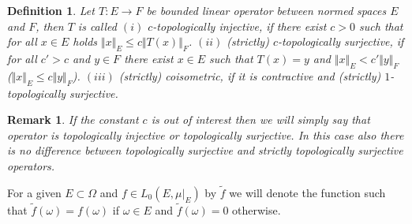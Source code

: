 \documentclass[12pt]{article}
\newtheorem{remark}[theorem]{Remark}
\newtheorem{definition}[theorem]{Definition}
\begin{document}
\begin{definition}\label{DefNorOpType} Let $ T:E\to F$ be bounded linear
    operator between normed spaces $E$ and $F$, then $ T$ is called
    \newline
    $(i)$ \textit{$c$-topologically injective}, if there exist $c > 0$ such that
    for all $x \in E$ holds $\Vert x\Vert_E\leq c\Vert  T(x)\Vert_F$.
    \newline
    $(ii)$ \textit{(strictly) $c$-topologically surjective}, if for all $c'>c$
    and  $y\in F$ there exist $x \in E$ such that $ T(x) = y$ and $\Vert x
        \Vert_E < c' \Vert y \Vert_F$ ($\Vert x \Vert_E \leq c \Vert y \Vert_F$).
    \newline
    $(iii)$ (strictly) coisometric, if it is contractive and (strictly)
    $1$-topologically surjective.
\end{definition}

\begin{remark} If the constant $c$ is out of interest then we will simply say
    that operator is topologically injective or topologically surjective. In
    this case also there is no difference between topologically surjective and
    strictly topologically surjective operators.
\end{remark}

For a given $E\subset \Omega$ and $f\in L_0(E,\mu|_{E})$ by $\widetilde{f}$ we
will denote the function such that $\widetilde{f}(\omega)=f(\omega)$ if
$\omega\in E$ and $\widetilde{f}(\omega)=0$ otherwise.
\end{document}
